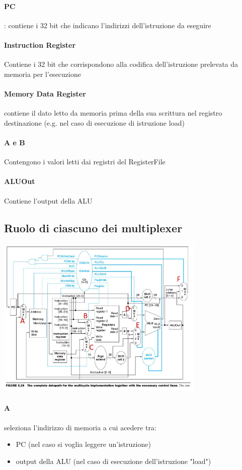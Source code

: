 \documentclass[12pt, a4paper, openany]{book}
\begin{document}
\paragraph*{PC}: contiene i 32 bit che indicano l'indirizzi dell'istruzione da eseguire
\paragraph*{Instruction Register} Contiene i 32 bit che corrispondono alla codifica
dell'istruzione prelevata da memoria per l'esecuzione
\paragraph*{Memory Data Register} contiene il dato letto da memoria prima della sua scrittura
nel registro destinazione (e.g. nel caso di esecuzione di istruzione load)
\paragraph*{A e B} Contengono i valori letti dai registri del RegisterFile
\paragraph*{ALUOut} Contiene l'output della ALU
\subsection{Ruolo di ciascuno dei multiplexer}
\begin{center}
    \includegraphics[width=100mm, scale=0.5]{Datapath Multiplexer.png}
\end{center}
\paragraph*{A} seleziona l'indirizzo di memoria a cui acedere tra:
\begin{itemize}
    \item PC (nel caso si voglia leggere un'istruzione)
    \item output della ALU (nel caso di esecuzione dell'istruzione "load")
\end{itemize}
\end{document}
